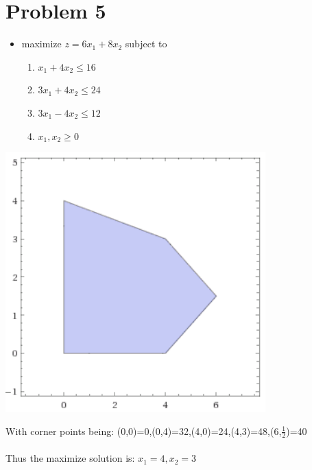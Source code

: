 \documentclass[11pt,a4paper,openany]{report}
\begin{document}
\section*{Problem 5}
\begin{itemize}
  \item maximize \(z=6x_1+8x_2\) subject to
  \begin{enumerate}
    \item \(x_1+4x_2\leq16\)
    \item \(3x_1+4x_2\leq24\)
    \item \(3x_1-4x_2\leq12\)
    \item \(x_1,x_2\geq0\)
  \end{enumerate}
\end{itemize}
\begin{center}
  \includegraphics[height=10cm]{images/p5_1}
\end{center}
With corner points being: (0,0)=0,(0,4)=32,(4,0)=24,(4,3)=48,(6,\(\frac{1}{2}\))=40\\\\
Thus the maximize solution is: \(x_1=4,x_2=3\)

\newpage
\end{document}

